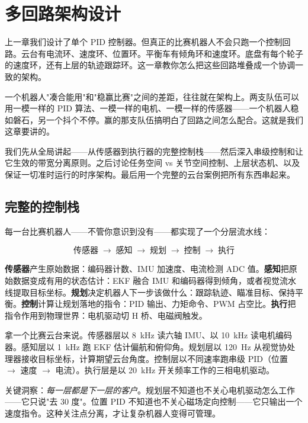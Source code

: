 \section{多回路架构设计}

上一章我们设计了单个 PID 控制器。但真正的比赛机器人不会只跑一个控制回路。云台有电流环、速度环、位置环。平衡车有倾角环和速度环。底盘有每个轮子的速度环，还有上层的轨迹跟踪环。这一章教你怎么把这些回路堆叠成一个协调一致的架构。

一个机器人"凑合能用"和"稳赢比赛"之间的差距，往往就在架构上。两支队伍可以用一模一样的 PID 算法、一模一样的电机、一模一样的传感器——一个机器人稳如磐石，另一个抖个不停。赢的那支队伍搞明白了回路之间怎么配合。这就是我们这章要讲的。

我们先从全局讲起——从传感器到执行器的完整控制栈——然后深入串级控制和让它生效的带宽分离原则。之后讨论任务空间 vs 关节空间控制、上层状态机、以及保证一切准时运行的时序架构。最后用一个完整的云台案例把所有东西串起来。

\subsection{完整的控制栈}

每一台比赛机器人——不管你意识到没有——都实现了一个分层流水线：

\[
\text{传感器} \;\longrightarrow\; \text{感知} \;\longrightarrow\; \text{规划} \;\longrightarrow\; \text{控制} \;\longrightarrow\; \text{执行}
\]

\textbf{传感器}产生原始数据：编码器计数、IMU 加速度、电流检测 ADC 值。\textbf{感知}把原始数据变成有用的状态估计：EKF 融合 IMU 和编码器得到倾角，或者视觉流水线提取目标坐标。\textbf{规划}决定机器人下一步该做什么：跟踪轨迹、瞄准目标、保持平衡。\textbf{控制}计算让规划落地的指令：PID 输出、力矩命令、PWM 占空比。\textbf{执行}把指令作用到物理世界：电机驱动切 H 桥、电磁阀触发。

拿一个比赛云台来说。传感器层以 8~kHz 读六轴 IMU、以 10~kHz 读电机编码器。感知层以 1~kHz 跑 EKF 估计偏航和俯仰角。规划层以 120~Hz 从视觉协处理器接收目标坐标，计算期望云台角度。控制层以不同速率跑串级 PID（位置 $\to$ 速度 $\to$ 电流）。执行层是以 20~kHz 开关频率工作的三相电机驱动。

关键洞察：\textit{每一层都是下一层的客户}。规划层不知道也不关心电机驱动怎么工作——它只说"去 30 度"。位置 PID 不知道也不关心磁场定向控制——它只输出一个速度指令。这种关注点分离，才让复杂机器人变得可管理。

